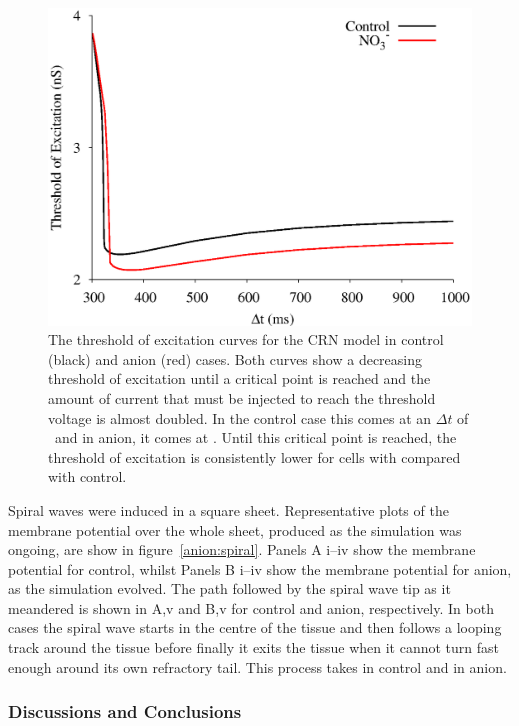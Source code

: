 \begin{figure}
\includegraphics{figures/toolkit/anion/09_ToE}
\caption[Anion Sensitive Threshold Of Excitation]{
\label{anion:toe} The threshold of excitation curves for the CRN model in
control (black) and anion (red) cases.  Both curves show a decreasing threshold
of excitation until a critical point is reached and the amount of current that
must be injected to reach the threshold voltage is almost doubled.  In the
control case this comes at an $\Delta t$ of \ and in anion, it comes at
.  Until this critical point is reached, the threshold of excitation is
consistently lower for cells with  compared with control.
}
\end{figure}

Spiral waves were induced in a square sheet.  Representative plots of the
membrane potential over the whole sheet, produced as the simulation was ongoing,
are show in figure~\ref{anion:spiral}.  Panels A i--iv show the membrane
potential for control, whilst Panels B i--iv show the membrane potential for
anion, as the simulation evolved.  The path followed by the spiral wave tip as
it meandered is shown in A,v and B,v for control and anion, respectively.  In
both cases the spiral wave starts in the centre of the tissue and then follows a
looping track around the tissue before finally it exits the tissue when it
cannot turn fast enough around its own refractory tail.  This process takes
 in control and  in anion.

\subsubsection{Discussions and Conclusions}

